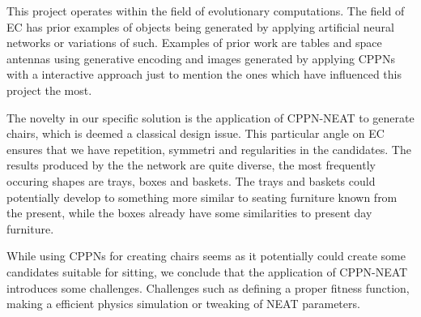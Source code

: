 This project operates within the field of evolutionary computations.
The field of EC has prior examples of objects being generated by applying artificial neural networks or variations of such.
Examples of prior work are tables and space antennas using generative encoding and images 
generated by applying CPPNs with a interactive approach just to mention the ones which have 
influenced this project the most.

The novelty in our specific solution is the application of CPPN-NEAT to generate chairs, which is deemed a classical design issue.
This particular angle on EC ensures that we have repetition, symmetri and regularities in the candidates.
The results produced by the the network are quite diverse, the most frequently occuring 
shapes are trays, boxes and baskets.
The trays and baskets could potentially develop to something more similar to seating furniture known 
from the present, while the boxes already have some similarities to present day furniture.

While using CPPNs for creating chairs seems as it potentially could create some candidates suitable 
for sitting, we conclude that the application of CPPN-NEAT introduces some challenges.
Challenges such as defining a proper fitness function, making a efficient physics simulation or 
tweaking of NEAT parameters.
